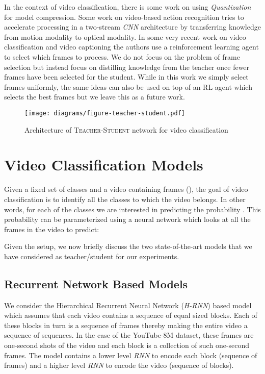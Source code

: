 \documentclass[10pt,twocolumn,letterpaper]{article}
\begin{document}
In the context of video classification, there is some work \cite{paper1,paper6} on using \textit{Quantization} for model compression. Some work on video-based action recognition \cite{motion-optical} tries to accelerate processing in a two-stream \textit{CNN} architecture by transferring knowledge from motion modality to optical modality. In some very recent work on video classification \cite{ijcai-rl} and video captioning \cite{less-frames-eccv} the authors use a reinforcement learning agent to select which frames to process. We do not focus on the problem of frame selection but instead focus on distilling knowledge from the teacher once fewer frames have been selected for the student. While in this work we simply select frames uniformly, the same ideas can also be used on top of an RL agent which selects the best frames but we leave this as a future work.



\begin{figure*}[t]
\centering
\texttt{[image: diagrams/figure-teacher-student.pdf]}
\caption{\label{diagram1} Architecture of \textsc{Teacher-Student} network for video classification}
\end{figure*}

\section{Video Classification Models}
Given a fixed set of  classes  and a video  containing  frames (), the goal of video classification is to identify all the classes to which the video belongs. In other words, for each of the  classes we are interested in predicting the probability . This probability can be parameterized using a neural network  which looks at all the frames in the video to predict:


Given the setup, we now briefly discuss the two state-of-the-art models that we have considered as teacher/student for our experiments. 

\subsection{Recurrent Network Based Models}
We consider the Hierarchical Recurrent Neural Network (\textit{H-RNN}) based model which assumes that each video contains a sequence of  equal sized blocks. Each of these blocks in turn is a sequence of  frames thereby making the entire video a sequence of sequences. In the case of the YouTube-8M dataset, these frames are one-second shots of the video and each block  is a collection of  such one-second frames. The model contains a lower level \textit{RNN} to encode each block (sequence of frames) and a higher level \textit{RNN} to encode the video (sequence of blocks).
\end{document}
